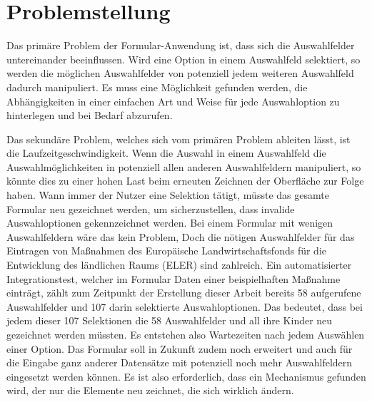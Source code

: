 
\section{Problemstellung}

Das primäre Problem der Formular-Anwendung ist, dass sich die Auswahlfelder untereinander beeinflussen.
Wird eine Option in einem Auswahlfeld selektiert, so werden die möglichen Auswahlfelder von potenziell jedem weiteren Auswahlfeld dadurch manipuliert.
Es muss eine Möglichkeit gefunden werden, die Abhängigkeiten in einer einfachen Art und Weise für jede Auswahloption zu hinterlegen und bei Bedarf abzurufen.


Das sekundäre Problem, welches sich vom primären Problem ableiten lässt, ist die  Laufzeitgeschwindigkeit. 
Wenn die Auswahl in einem Auswahlfeld die Auswahlmöglichkeiten in potenziell allen anderen Auswahlfeldern manipuliert, so könnte dies zu einer hohen Last beim erneuten Zeichnen der Oberfläche zur Folge haben.
Wann immer der Nutzer eine Selektion tätigt, müsste das gesamte Formular neu gezeichnet werden, um sicherzustellen, dass invalide Auswahloptionen gekennzeichnet werden.
Bei einem  Formular mit wenigen Auswahlfeldern wäre das kein Problem,
Doch die nötigen Auswahlfelder für das Eintragen von Maßnahmen  des Europäische Landwirtschaftsfonds für die Entwicklung des ländlichen Raums (ELER) sind zahlreich.
Ein  automatisierter Integrationstest, welcher im Formular Daten einer beispielhaften Maßnahme einträgt, zählt zum Zeitpunkt der Erstellung dieser Arbeit bereits 58 aufgerufene Auswahlfelder und 107 darin selektierte Auswahloptionen.
Das bedeutet, dass bei jedem dieser 107 Selektionen die 58 Auswahlfelder und all ihre Kinder neu gezeichnet werden müssten.
Es entstehen also Wartezeiten nach jedem Auswählen einer Option.
Das Formular soll in Zukunft zudem noch erweitert und auch für die Eingabe ganz anderer Datensätze mit potenziell noch mehr Auswahlfeldern eingesetzt werden können.
Es ist also erforderlich, dass ein Mechanismus gefunden wird,  der nur die Elemente neu zeichnet, die sich wirklich ändern.
